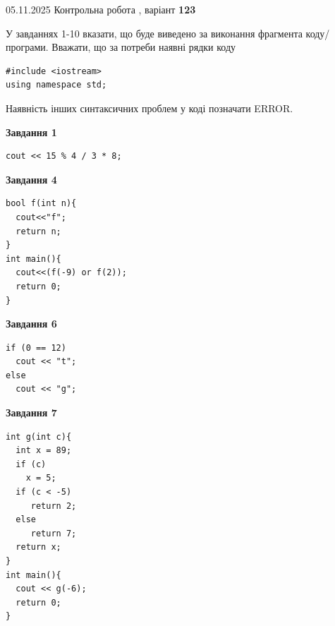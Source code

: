 \documentclass[12pt, ukrainian]{article}
\begin{document}
{\Large{05.11.2025 Контрольна робота , варіант  \No \textbf { 123 }\par}}
{
\begin {large}
У завданнях 1-10 вказати, що буде виведено за виконання фрагмента коду/про\-гра\-ми.
Вважати, що за потреби наявні рядки коду
\begin{verbatim}
#include <iostream>
using namespace std;
\end{verbatim}
Наявність інших синтаксичних проблем у коді позначати ERROR.

\begin{minipage}[t]{7.0cm}

\begin{center}
\textbf{Завдання 1}
\end{center}
\vspace{-8mm}

\begin{verbatim}
cout << 15 % 4 / 3 * 8;
\end{verbatim}



\begin{center}
\textbf{Завдання 4}
\end{center}
\vspace{-8mm}

\begin{verbatim}
bool f(int n){
  cout<<"f";
  return n;
}
int main(){
  cout<<(f(-9) or f(2));
  return 0;
}
\end{verbatim}



\begin{center}
\textbf{Завдання 6}
\end{center}
\vspace{-8mm}

\begin{verbatim}
if (0 == 12)
  cout << "t";
else
  cout << "g";
\end{verbatim}



\begin{center}
\textbf{Завдання 7}
\end{center}
\vspace{-8mm}

\begin{verbatim}
int g(int c){
  int x = 89;
  if (c)
    x = 5;
  if (c < -5)
     return 2;
  else
     return 7;
  return x;
}
int main(){
  cout << g(-6);
  return 0;
}
\end{verbatim}


\end{minipage}
\end{large}}
\end{document}
